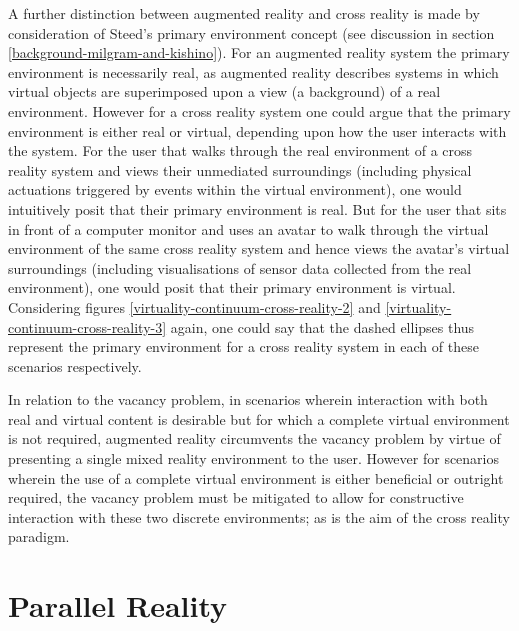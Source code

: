 A further distinction between augmented reality and cross reality is made by consideration of Steed's primary environment concept (see discussion in section \ref{background-milgram-and-kishino}). For an augmented reality system the primary environment is necessarily real, as augmented reality describes systems in which virtual objects are superimposed upon a view (a background) of a real environment. However for a cross reality system one could argue that the primary environment is either real or virtual, depending upon how the user interacts with the system. For the user that walks through the real environment of a cross reality system and views their unmediated surroundings (including physical actuations triggered by events within the virtual environment), one would intuitively posit that their primary environment is real. But for the user that sits in front of a computer monitor and uses an avatar to walk through the virtual environment of the same cross reality system and hence views the avatar's virtual surroundings (including visualisations of sensor data collected from the real environment), one would posit that their primary environment is virtual. Considering figures \ref{virtuality-continuum-cross-reality-2} and \ref{virtuality-continuum-cross-reality-3} again, one could say that the dashed ellipses thus represent the primary environment for a cross reality system in each of these scenarios respectively.

In relation to the vacancy problem, in scenarios wherein interaction with both real and virtual content is desirable but for which a complete virtual environment is not required, augmented reality circumvents the vacancy problem by virtue of presenting a single mixed reality environment to the user. However for scenarios wherein the use of a complete virtual environment is either beneficial or outright required, the vacancy problem must be mitigated to allow for constructive interaction with these two discrete environments; as is the aim of the cross reality paradigm.


\section{Parallel Reality}
\label{parallelrealityinbackground}
\newcommand{\PRfootnote}{\footnote{Note that the use of `PR' in the quotation in section \ref{subsec_HyperReality} is a reference to `physical reality' (that author's term for what this thesis simply calls `reality') and is not a reference to parallel reality.}}

